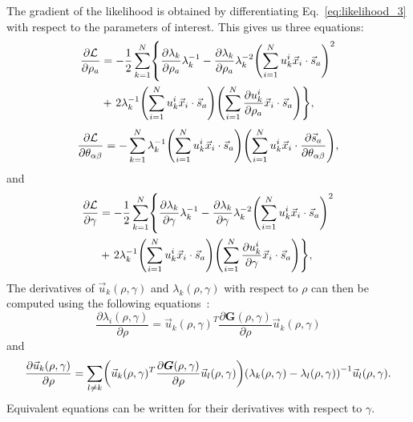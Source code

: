 \documentclass[preprint,amsmath,amssymb,superscriptaddress,showpacs,pre]{revtex4-1}
\let\originalleft\left
\let\originalright\right
\renewcommand{\left}{\mathopen{}\mathclose\bgroup\originalleft}
\renewcommand{\right}{\aftergroup\egroup\originalright}
\def\vx{\vec x}
\newcommand{\vsa}{\vec{s}_a}
\begin{document}
The gradient of the likelihood is obtained by differentiating Eq.~\eqref{eq:likelihood_3} with respect to the parameters of interest. 
This gives us  three equations: 
\begin{equation}
	\begin{split}
		\frac{\partial \mathcal{L}}{\partial\rho_a} &= -\frac 1 2 \sum_{k=1}^N \left\{ \frac{\partial\lambda_k}{\partial\rho_a}\lambda_k^{-1} - \frac{\partial\lambda_k}{\partial\rho_a} \lambda_k^{-2}\left(\sum_{i=1}^N u_{k}^i\vx_i\cdot\vsa\right)^2 \right. \\
		&+ \left. 2\lambda_k^{-1} \left(\sum_{i=1}^N u_k^i\vx_i\cdot\vsa\right) \left(\sum_{i=1}^N \frac{\partial u_k^i}{\partial\rho_a} \vx_i\cdot\vsa\right) \right\}, 
	\end{split}
	\label{eq:gradlikelihood_1}
\end{equation}
\begin{equation}
	\frac{\partial \mathcal{L}}{\partial\theta_{\alpha\beta}} = -\sum_{k=1}^N \lambda_k^{-1} \left(\sum_{i=1}^N u_k^i\vx_i\cdot\vsa\right) \left(\sum_{i=1}^N u_k^i \vx_i\cdot\frac{\partial \vsa}{\partial\theta_{\alpha\beta}}\right),
	\label{eq:gradlikelihood_2}
\end{equation}
and
\begin{equation}
	\begin{split}
		\frac{\partial \mathcal{L}}{\partial\gamma} &= -\frac 1 2 \sum_{k=1}^N \left\{ \frac{\partial\lambda_k}{\partial\gamma}\lambda_k^{-1} - \frac{\partial\lambda_k}{\partial\gamma} \lambda_k^{-2}\left(\sum_{i=1}^N u_{k}^i\vx_i\cdot\vsa\right)^2 \right. \\
		&+ \left. 2\lambda_k^{-1} \left(\sum_{i=1}^N u_k^i\vx_i\cdot\vsa\right) \left(\sum_{i=1}^N \frac{\partial u_k^i}{\partial\gamma} \vx_i\cdot\vsa\right) \right\}, 
	\end{split}
	\label{eq:gradlikelihood_3}
\end{equation}
The derivatives of $\vec{u}_k(\rho,\gamma)$ and $\lambda_k(\rho,\gamma)$ with respect to $\rho$ can then be computed using the following equations~\cite{matrix_cook_book}: 
\begin{equation}
	\frac{\partial\lambda_i(\rho,\gamma)}{\partial\rho} = \vec{u}_k(\rho,\gamma)^T\frac{\partial\bm{G}(\rho,\gamma)}{\partial\rho}\vec{u}_k(\rho,\gamma)
	\label{eq:grad_eigval}
\end{equation}
and
\begin{equation}
	\frac{\partial \vec{u}_k(\rho,\gamma)}{\partial\rho} = \sum_{l\neq k} \left( \vec{u}_k(\rho,\gamma)^T\frac{\partial\bm{G}(\rho,\gamma)}{\partial\rho}\vec{u}_l(\rho,\gamma) \right) \left(\lambda_k(\rho,\gamma) - \lambda_l(\rho,\gamma)\right)^{-1} \vec{u}_l(\rho,\gamma).
	\label{eq:grad_eigvec}
\end{equation}
Equivalent equations can be written for their derivatives with respect to $\gamma$. 
\end{document}
